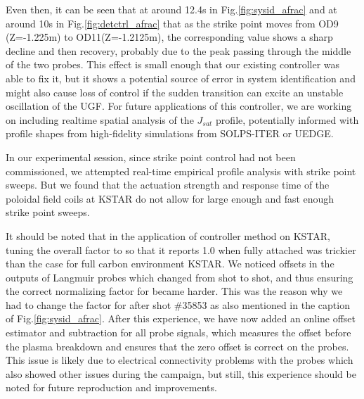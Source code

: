 Even then, it can be seen that at around 12.4s in Fig.\ref{fig:sysid_afrac} and at around 10s in Fig.\ref{fig:detctrl_afrac} that as the strike point moves from OD9 (Z=-1.225m) to OD11(Z=-1.2125m), the corresponding \Afrac value shows a sharp decline and then recovery, probably due to the peak passing through the middle of the two probes.
This effect is small enough that our existing controller was able to fix it, but it shows a potential source of error in system identification and might also cause loss of control if the sudden transition can excite an unstable oscillation of the \ac{UGF}.
For future applications of this controller, we are working on including realtime spatial analysis of the $J_{sat}$ profile, potentially informed with profile shapes from high-fidelity simulations from SOLPS-ITER or UEDGE.

In our experimental session, since strike point control had not been commissioned, we attempted real-time empirical profile analysis with strike point sweeps.
But we found that the actuation strength and response time of the poloidal field coils at KSTAR do not allow for large enough and fast enough strike point sweeps.

It should be noted that in the application of \Afrac controller method on KSTAR, tuning the overall factor to \Afrac so that it reports 1.0 when fully attached was trickier than the case for full carbon environment KSTAR\cite{Eldon_2022_PPCF}.
We noticed offsets in the outputs of Langmuir probes which changed from shot to shot, and thus ensuring the correct normalizing factor for \Afrac became harder.
This was the reason why we had to change the factor for \Afrac after shot \#35853 as also mentioned in the caption of Fig.\ref{fig:sysid_afrac}.
After this experience, we have now added an online offset estimator and subtraction for all probe signals, which measures the offset before the plasma breakdown and ensures that the zero offset is correct on the probes.
This issue is likely due to electrical connectivity problems with the probes which also showed other issues during the campaign, but still, this experience should be noted for future reproduction and improvements.

